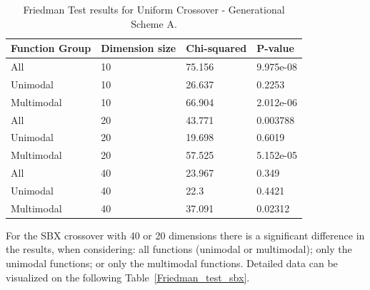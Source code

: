 \begin{table}[h]
	\centering
	\begin{tabular}{|l|l|l|l|}
		\hline
		\textbf{Function Group} & \textbf{Dimension size}      & \textbf{Chi-squared}        & \textbf{P-value}                     \\ \hline
		\multicolumn{1}{|l|}{All} & \multicolumn{1}{|l|}{10} & \multicolumn{1}{l|}{75.156} & \multicolumn{1}{l|}{9.975e-08} \\ \hline
		\multicolumn{1}{|l|}{Unimodal} & \multicolumn{1}{|l|}{10} & \multicolumn{1}{l|}{26.637} & \multicolumn{1}{l|}{0.2253} \\ \hline
		\multicolumn{1}{|l|}{Multimodal} & \multicolumn{1}{|l|}{10} & \multicolumn{1}{l|}{66.904} & \multicolumn{1}{l|}{2.012e-06}  \\ \hline
		\hline
		\multicolumn{1}{|l|}{All} & \multicolumn{1}{|l|}{20} & \multicolumn{1}{l|}{43.771} & \multicolumn{1}{l|}{0.003788} \\ \hline
		\multicolumn{1}{|l|}{Unimodal} & \multicolumn{1}{|l|}{20} & \multicolumn{1}{l|}{19.698} & \multicolumn{1}{l|}{0.6019} \\ \hline
		\multicolumn{1}{|l|}{Multimodal} & \multicolumn{1}{|l|}{20} & \multicolumn{1}{l|}{57.525} & \multicolumn{1}{l|}{5.152e-05}  \\ \hline
		\hline	
		\multicolumn{1}{|l|}{All} & \multicolumn{1}{|l|}{40} & \multicolumn{1}{l|}{23.967} & \multicolumn{1}{l|}{0.349} 						\\ \hline
		\multicolumn{1}{|l|}{Unimodal} & \multicolumn{1}{|l|}{40} & \multicolumn{1}{l|}{22.3} & \multicolumn{1}{l|}{0.4421} \\ \hline
		\multicolumn{1}{|l|}{Multimodal} & \multicolumn{1}{|l|}{40} & \multicolumn{1}{l|}{37.091} & \multicolumn{1}{l|}{0.02312}  \\ \hline
	\end{tabular}
	\caption{Friedman Test results for Uniform Crossover - Generational Scheme A.}
	\label{Friedman_test_uniform}	
\end{table}

For the SBX crossover with 40 or 20 dimensions there is a significant difference in the results, when considering: all functions (unimodal or multimodal); only the unimodal functions; or only the multimodal functions. Detailed data can be visualized on the following Table~\ref{Friedman_test_sbx}. 



